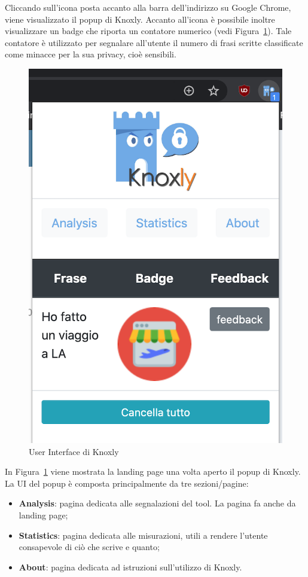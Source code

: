 Cliccando sull'icona posta accanto alla barra dell'indirizzo su Google Chrome, viene visualizzato il popup di Knoxly. Accanto all'icona è possibile inoltre visualizzare un badge che riporta un contatore numerico (vedi Figura~\ref{fig:uiKnoxly}). Tale contatore è utilizzato per segnalare all'utente il numero di frasi scritte classificate come minacce per la sua privacy, cioè sensibili. 


\begin{figure}[h]
    \centering
    \includegraphics[scale=0.7]{Figure/ui/UI-Knoxly.png}
    \caption{User Interface di Knoxly}
    \label{fig:uiKnoxly}
\end{figure}
\FloatBarrier

In Figura~\ref{fig:uiKnoxly} viene mostrata la landing page una volta aperto il popup di Knoxly. La UI del popup è composta principalmente da tre sezioni/pagine:
\begin{itemize}
    \item \textbf{Analysis}: pagina dedicata alle segnalazioni del tool. La pagina fa anche da landing page;
    \item \textbf{Statistics}: pagina dedicata alle misurazioni, utili a rendere l'utente consapevole di ciò che scrive e quanto;
    \item \textbf{About}: pagina dedicata ad istruzioni sull'utilizzo di Knoxly.
\end{itemize}

